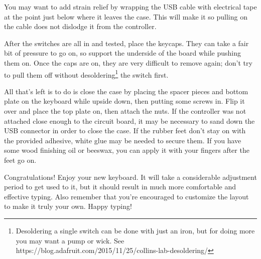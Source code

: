 \documentclass[landscape,twocolumn]{article}
\begin{document}
\vspace{1em}

You may want to add strain relief by wrapping the USB cable with
electrical tape at the point just below where it leaves the case. This
will make it so pulling on the cable does not dislodge it from the
controller.

\vspace{1em}

After the switches are all in and tested, place the keycaps. They can
take a fair bit of pressure to go on, so support the underside of the
board while pushing them on. Once the caps are on, they are very
difficult to remove again; don't try to pull them off without
desoldering\footnote{Desoldering a single switch can be done with just
  an iron, but for doing more you may want a pump or wick. See
  https://blog.adafruit.com/2015/11/25/collins-lab-desoldering/} the
switch first.

\vspace{1em}

All that's left is to do is close the case by placing the spacer
pieces and bottom plate on the keyboard while upside down, then
putting some screws in. Flip it over and place the top plate on, then
attach the nuts. If the controller was not attached close enough to
the circuit board, it may be necessary to sand down the USB connector
in order to close the case. If the rubber feet don't stay on with the
provided adhesive, white glue may be needed to secure them. If you
have some wood finishing oil or beeswax, you can apply it with your
fingers after the feet go on.

\vspace{1em}

Congratulations! Enjoy your new keyboard. It will take a
considerable adjustment period to get used to it, but it should result
in much more comfortable and effective typing. Also remember that
you're encouraged to customize the layout to make it truly your
own. Happy typing!
\end{document}
